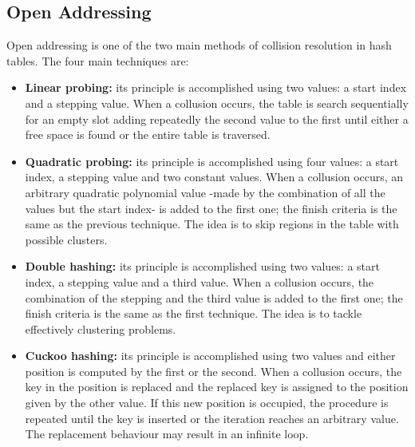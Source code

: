 \documentclass{article}
\begin{document}
\subsection{Open Addressing}
Open addressing is one of the two main methods of collision resolution in hash tables. The four main techniques are:

\begin{itemize}
    \item \textbf{Linear probing:} its principle is accomplished using two values: a start index and a stepping value. When a collusion occurs, the table is search sequentially for an empty slot adding repeatedly the second value to the first until either a free space is found or the entire table is traversed.
    \item \textbf{Quadratic probing:} its principle is accomplished using four values: a start index, a stepping value and two constant values. When a collusion occurs, an arbitrary quadratic polynomial value -made by the combination of all the values but the start index- is added to the first one; the finish criteria is the same as the previous technique. The idea is to skip regions in the table with possible clusters.
    \item \textbf{Double hashing:} its principle is accomplished using two values: a start index, a stepping value and a third value. When a collusion occurs, the combination of the stepping and the third value is added to the first one; the finish criteria is the same as the first technique. The idea is to tackle effectively clustering problems.
    \item \textbf{Cuckoo hashing:} its principle is accomplished using two values and either position is computed by the first or the second. When a collusion occurs, the key in the position is replaced and the replaced key is assigned to the position given by the other value. If this new position is occupied, the procedure is repeated until the key is inserted or the iteration reaches an arbitrary value. The replacement behaviour may result in an infinite loop. 
\end{itemize}
\end{document}
